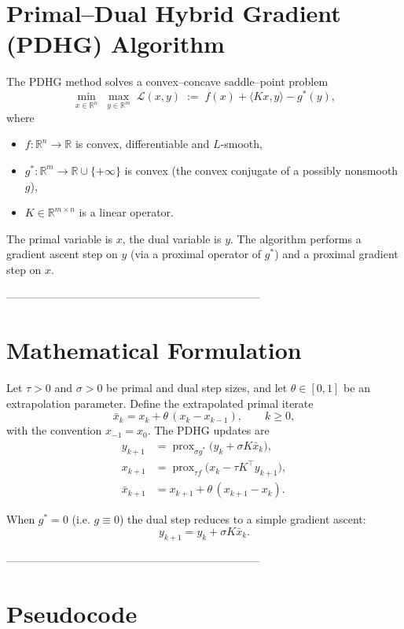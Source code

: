 \documentclass{article}
\newcommand{\prox}{\operatorname{prox}}
\begin{document}
\section*{Primal–Dual Hybrid Gradient (PDHG) Algorithm}

The PDHG method solves a convex–concave saddle–point problem
\[
\min_{x\in\mathbb{R}^{n}}\;\max_{y\in\mathbb{R}^{m}}
\; \mathcal{L}(x,y)\;:=\; f(x)+\langle Kx , y\rangle - g^{*}(y),
\tag{1}
\]
where  

\begin{itemize}
  \item $f:\mathbb{R}^{n}\!\to\!\mathbb{R}$ is convex, differentiable and $L$‑smooth,
  \item $g^{*}:\mathbb{R}^{m}\!\to\!\mathbb{R}\cup\{+\infty\}$ is convex (the convex conjugate of a possibly nonsmooth $g$),
  \item $K\in\mathbb{R}^{m\times n}$ is a linear operator.
\end{itemize}
The primal variable is $x$, the dual variable is $y$.
The algorithm performs a gradient ascent step on $y$ (via a proximal operator of $g^{*}$) and a proximal gradient step on $x$.

---------------------------------------------------------------------

\section*{Mathematical Formulation}

Let $\tau>0$ and $\sigma>0$ be primal and dual step sizes, and let $\theta\in[0,1]$ be an extrapolation parameter.
Define the extrapolated primal iterate
\[
\bar{x}_{k}=x_{k}+\theta\,(x_{k}-x_{k-1}),\qquad k\ge 0,
\tag{2}
\]
with the convention $x_{-1}=x_{0}$.
The PDHG updates are
\[
\boxed{
\begin{aligned}
y_{k+1}&=\prox_{\sigma g^{*}}\!\bigl( y_{k}+\sigma K\bar{x}_{k}\bigr), \\[4pt]
x_{k+1}&=\prox_{\tau f}\!\bigl( x_{k}-\tau K^{\top}y_{k+1}\bigr), \\[4pt]
\bar{x}_{k+1}&=x_{k+1}+\theta\,(x_{k+1}-x_{k}) .
\end{aligned}}
\tag{3}
\]

When $g^{*}=0$ (i.e. $g\equiv0$) the dual step reduces to a simple gradient ascent:
\[
y_{k+1}=y_{k}+\sigma K\bar{x}_{k}.
\tag{4}
\]

---------------------------------------------------------------------

\section*{Pseudocode}
\end{document}
